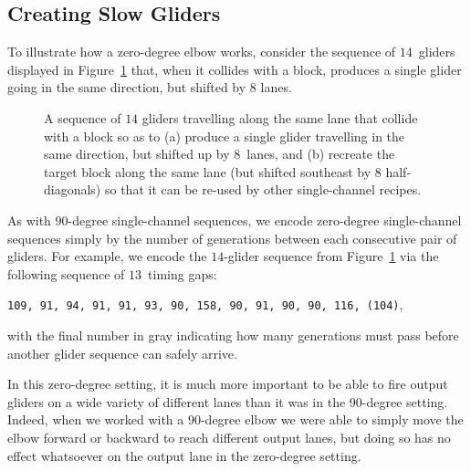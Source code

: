 \subsection{Creating Slow Gliders}\label{sec:single_channel_zero_make_slow}

To illustrate how a zero-degree elbow works, consider the sequence of $14$~gliders displayed in Figure~\ref{fig:lane_8_0degree} that, when it collides with a block, produces a single glider going in the same direction, but shifted by $8$ lanes.

\begin{figure}[!htb]
	\centering
	\caption{A sequence of $14$ gliders travelling along the same lane that collide with a block so as to (a) produce a single glider travelling in the same direction, but shifted up by $8$~lanes, and (b) recreate the target block along the same lane (but shifted southeast by 8 half-diagonals) so that it can be re-used by other single-channel recipes.}\label{fig:lane_8_0degree}
\end{figure}

As with $90$-degree single-channel sequences, we encode zero-degree single-channel sequences simply by the number of generations between each consecutive pair of gliders. For example, we encode the $14$-glider sequence from Figure~\ref{fig:lane_8_0degree} via the following sequence of $13$~timing gaps:
\begin{center}
	\texttt{109, 91, 94, 91, 91, 93, 90, 158, 90, 91, 90, 90, 116, {\color{gray}(104)}},
\end{center}
with the final number in gray indicating how many generations must pass before another glider sequence can safely arrive.

In this zero-degree setting, it is much more important to be able to fire output gliders on a wide variety of different lanes than it was in the 90-degree setting. Indeed, when we worked with a 90-degree elbow we were able to simply move the elbow forward or backward to reach different output lanes, but doing so has no effect whatsoever on the output lane in the zero-degree setting.

